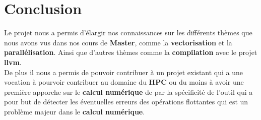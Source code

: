 \documentclass[11pt]{article}
\begin{document}
\section{Conclusion}
\label{sec:org9685918}

Le projet nous a permis d'élargir nos connaissances sur les différents thèmes
que nous avons vus dans nos cours de \textbf{Master}, comme la \textbf{vectorisation} et la
\textbf{parallélisation}. Ainsi que d'autres thèmes comme la \textbf{compilation} avec le
projet \textbf{llvm}.
\\ \vspace{5mm}
De plus il nous a permis de pouvoir contribuer à un projet existant qui a une
vocation à pourvoir contribuer au domaine du \textbf{HPC} ou du moins à avoir une
première apporche sur le \textbf{calcul numérique} de par la spécificité de l'outil
qui a pour but de détecter les éventuelles erreurs des opérations flottantes
qui est un problème majeur dans le \textbf{calcul numérique}.
\end{document}
